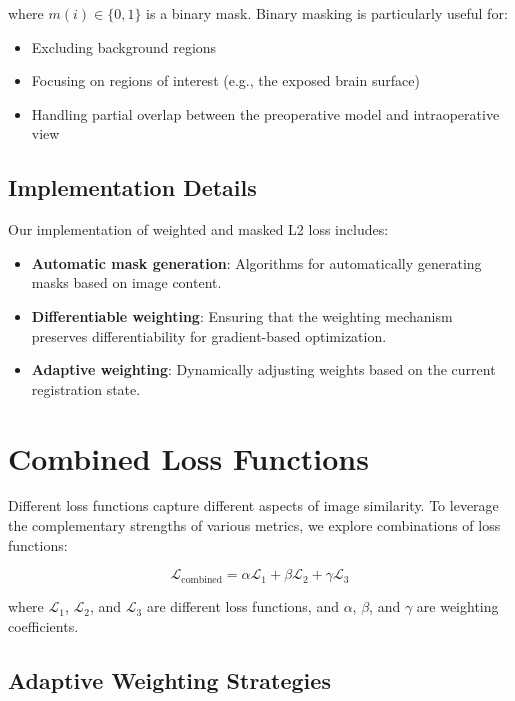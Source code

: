 where $m(i) \in \{0, 1\}$ is a binary mask. Binary masking is particularly useful for:

\begin{itemize}
    \item Excluding background regions
    \item Focusing on regions of interest (e.g., the exposed brain surface)
    \item Handling partial overlap between the preoperative model and intraoperative view
\end{itemize}

\subsection{Implementation Details}

Our implementation of weighted and masked L2 loss includes:

\begin{itemize}
    \item \textbf{Automatic mask generation}: Algorithms for automatically generating masks based on image content.
    
    \item \textbf{Differentiable weighting}: Ensuring that the weighting mechanism preserves differentiability for gradient-based optimization.
    
    \item \textbf{Adaptive weighting}: Dynamically adjusting weights based on the current registration state.
\end{itemize}

\section{Combined Loss Functions}

Different loss functions capture different aspects of image similarity. To leverage the complementary strengths of various metrics, we explore combinations of loss functions:

\begin{equation}
    \mathcal{L}_{\text{combined}} = \alpha \mathcal{L}_1 + \beta \mathcal{L}_2 + \gamma \mathcal{L}_3
\end{equation}

where $\mathcal{L}_1$, $\mathcal{L}_2$, and $\mathcal{L}_3$ are different loss functions, and $\alpha$, $\beta$, and $\gamma$ are weighting coefficients.

\subsection{Adaptive Weighting Strategies}

